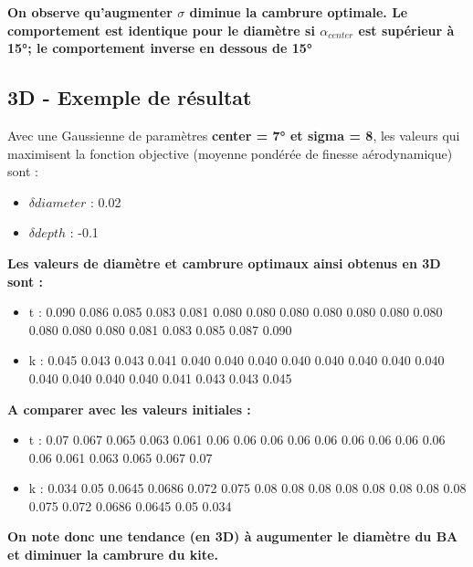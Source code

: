     \textbf{ On observe qu'augmenter $\sigma$ diminue la cambrure optimale. Le comportement est identique pour le diamètre si $\alpha_{center}$ est supérieur à 15°; le comportement inverse en dessous de 15°}
    
\subsection{3D - Exemple de résultat}
\label{sec:Ch3.4}

Avec une Gaussienne de paramètres \textbf{center = 7° et sigma = 8}, les valeurs qui maximisent la fonction objective (moyenne pondérée de finesse aérodynamique) sont :
\begin{itemize}
    \item $\delta diameter$ : 0.02
    \item $\delta depth$ : -0.1
\end{itemize}
\smallskip

\textbf{Les valeurs de diamètre et cambrure optimaux ainsi obtenus en 3D sont : 
}
\begin{itemize}
    \item t : 0.090 0.086 0.085 0.083 0.081 0.080 0.080  0.080 0.080 0.080 0.080  0.080 0.080 0.080 0.080 0.081 0.083 0.085 0.087 0.090
    \item k : 0.045 0.043 0.043 0.041 0.040 0.040 0.040  0.040 0.040 0.040 0.040 0.040 0.040 0.040  0.040 0.040 0.041 0.043 0.043 0.045
\end{itemize}
\smallskip

\textbf{A comparer avec les valeurs initiales :}
\begin{itemize}
    \item t : 0.07 0.067 0.065 0.063 0.061 0.06 0.06  0.06 0.06 0.06  0.06  0.06 0.06 0.06  0.06 0.061 0.063 0.065 0.067 0.07
    \item k : 0.034 0.05 0.0645 0.0686 0.072 0.075 0.08 0.08 0.08 0.08 0.08 0.08 0.08 0.08 0.075 0.072 0.0686 0.0645 0.05 0.034
\end{itemize}

\textbf{On note donc une tendance (en 3D) à augumenter le diamètre du BA et diminuer la cambrure du kite. }
